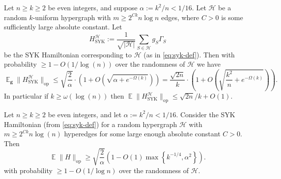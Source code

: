 \documentclass[10pt,a4paper]{amsart}
\DeclareMathOperator*{\E}{\mathbb{E}}
\newcommand{\cH}{\mathcal H}
\renewcommand{\geq}{\geqslant}
\renewcommand{\leq}{\leqslant}
\begin{document}
\begin{theorem}\label{thm:syk-spectral-norm-random}
    Let $n\geq k\geq 2$ be even integers, and suppose $\alpha:= k^2/n < 1/16$.  Let $\cH$ be a random $k$-uniform hypergraph with $m\geq 2^{Ck}n\log n$ edges, where $C > 0$ is some sufficiently large absolute constant. Let 
    \[H^\cH_{\operatorname{SYK}}:= \frac{1}{\sqrt{|\cH|}}\sum_{S\in\cH}g_S\Gamma_S\]
    be the SYK Hamiltonian corresponding to $\cH$ (as in \cref{eq:syk-def}). Then with probability $\geq 1 - O(1/\log(n))$ over the randomness of $\cH$ we have 
    \[\E_{\bm g}\|H^\cH_{\operatorname{SYK}}\|_{\operatorname{op}}\leq \sqrt{\frac{2}{\alpha}}\cdot\left(1 + O\left(\sqrt{\alpha + e^{-\Omega(k)}}\right)\right) = \frac{\sqrt{2n}}{k}\cdot\left(1 + O\left(\sqrt{\frac{k^2}{n} + e^{-\Omega(k)}}\right)\right).\]
    In particular if $k\geq\omega(\log(n))$ then $\E\|H^\cH_{\operatorname{SYK}}\|_{\operatorname{op}}\leq \sqrt{2n}/k + O(1)$.
\end{theorem}

\begin{theorem}\label{thm:syk-spectral-norm-lower-random}
    Let $n\geq k\geq 2$ be even integers, and let $\alpha:= k^2/n < 1/16$. Consider the SYK Hamiltonian (from \cref{eq:syk-def}) for a random hypergraph $\cH$ with $m\geq 2^{Ck}n\log(n)$ hyperedges for some large enough absolute constant $C > 0$. Then 
    \[\E\|H\|_{\operatorname{op}}\geq
\sqrt{\frac2\alpha}
\left(
1-O(1)\max\left\{
k^{-1/4},
\alpha^2
\right\}
\right).\]
with probability $\geq 1-O(1/\log n)$ over the randomness of $\cH$.
\end{theorem}
\end{document}
